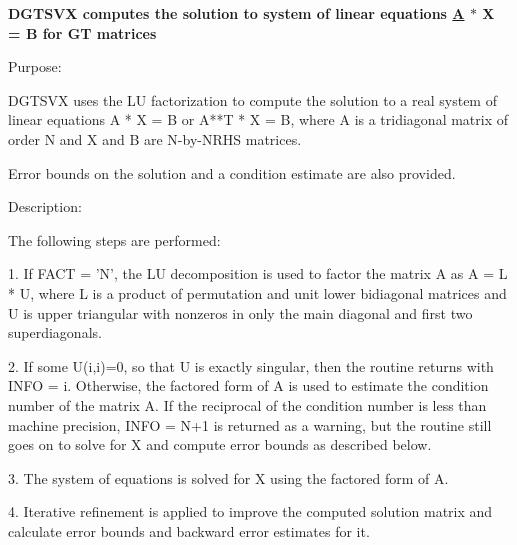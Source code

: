 {\bfseries  D\+G\+T\+S\+V\+X computes the solution to system of linear equations \hyperlink{classA}{A} $\ast$ X = B for G\+T matrices {\bfseries  }}

 \begin{DoxyParagraph}{Purpose\+: }
\begin{DoxyVerb} DGTSVX uses the LU factorization to compute the solution to a real
 system of linear equations A * X = B or A**T * X = B,
 where A is a tridiagonal matrix of order N and X and B are N-by-NRHS
 matrices.

 Error bounds on the solution and a condition estimate are also
 provided.\end{DoxyVerb}
 
\end{DoxyParagraph}
\begin{DoxyParagraph}{Description\+: }
\begin{DoxyVerb} The following steps are performed:

 1. If FACT = 'N', the LU decomposition is used to factor the matrix A
    as A = L * U, where L is a product of permutation and unit lower
    bidiagonal matrices and U is upper triangular with nonzeros in
    only the main diagonal and first two superdiagonals.

 2. If some U(i,i)=0, so that U is exactly singular, then the routine
    returns with INFO = i. Otherwise, the factored form of A is used
    to estimate the condition number of the matrix A.  If the
    reciprocal of the condition number is less than machine precision,
    INFO = N+1 is returned as a warning, but the routine still goes on
    to solve for X and compute error bounds as described below.

 3. The system of equations is solved for X using the factored form
    of A.

 4. Iterative refinement is applied to improve the computed solution
    matrix and calculate error bounds and backward error estimates
    for it.\end{DoxyVerb}
 
\end{DoxyParagraph}

